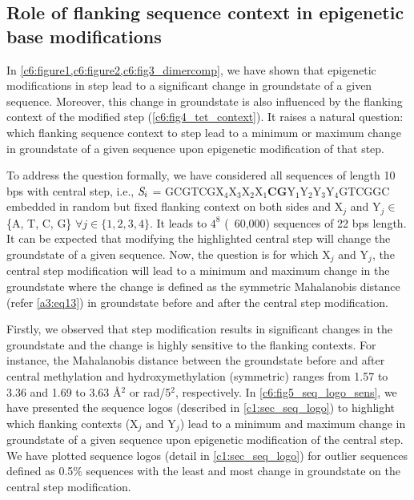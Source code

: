 \subsection{Role of flanking sequence context in epigenetic base modifications}
In \cref{c6:figure1,c6:figure2,c6:fig3_dimercomp}, we have shown that epigenetic modifications in \cpg step lead to a significant change in groundstate of a given sequence.
Moreover, this change in groundstate is also influenced by the flanking context of the modified \cpg step (\cref{c6:fig4_tet_context}).
It raises a natural question: which flanking sequence context to \cpg step lead to a minimum or maximum change in groundstate of a given sequence upon epigenetic modification of that \cpg step.

To address the question formally, we have considered all sequences of length 10 bps with central \cpg step, i.e., ${\textit{S}}_i$ =  GCGTCGX$_4$X$_3$X$_2$X$_1$\textbf{CG}Y$_1$Y$_2$Y$_3$Y$_4$GTCGGC embedded in random but fixed flanking context on both sides and X$_j$ and Y$_j \in$ \{A, T, C, G\} $\forall j \in \{1,2,3,4\}$.
It leads to $4^8$ (~60,000) sequences of 22 bps length.
It can be expected that modifying the highlighted central \cpg step will change the groundstate of a given sequence.
Now, the question is for which X$_j$ and Y$_j$, the central \cpg step modification will lead to a minimum and maximum change in the groundstate where the change is defined as the symmetric Mahalanobis distance (refer \cref{a3:eq13}) in groundstate before and after the central \cpg step modification.


Firstly, we observed that \cpg step modification results in significant changes in the groundstate and the change is highly sensitive to the flanking contexts.
For instance, the Mahalanobis distance between the groundstate before and after central \cpg methylation and hydroxymethylation (symmetric) ranges from 1.57 to 3.36 and 1.69 to 3.63 \AA$^2$ or rad/5$^2$, respectively.
In \cref{c6:fig5_seq_logo_sens}, we have presented the sequence logos (described in \cref{c1:sec_seq_logo}) to highlight which flanking contexts (X$_j$ and Y$_j$) lead to a minimum and maximum change in groundstate of a given sequence upon epigenetic modification of the central \cpg step.
We have plotted sequence logos (detail in \cref{c1:sec_seq_logo}) for outlier sequences defined as 0.5\% sequences with the least and most change in groundstate on the central \cpg step modification. 

